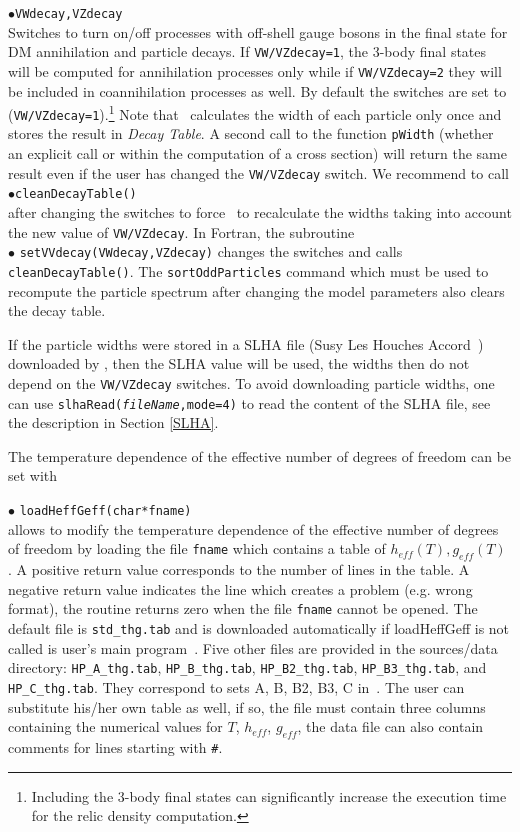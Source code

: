 \documentclass[12pt,a4paper]{article}
\begin{document}
\noindent
$\bullet$\verb|VWdecay,VZdecay|\\
Switches to turn on/off  processes with off-shell gauge bosons in the final state for DM annihilation and particle decays.
If \verb|VW/VZdecay=1|, the  3-body final states will be computed for annihilation processes only while 
if \verb|VW/VZdecay=2| they will be included in coannihilation processes as well.
By  default  the switches are set to (\verb|VW/VZdecay=1|).\footnote{Including the 3-body final states can significantly increase the execution time for the relic density computation.}
Note that \micro\ calculates the width of each particle only once and stores the
result in {\it Decay Table}.  A second call to the function \verb|pWidth| (whether an explicit call or within the computation of a cross section)   will return the same result  even if the user has changed the {\tt VW/VZdecay} switch.  
We recommend to call\\
$\bullet$\verb|cleanDecayTable()| \\
after changing the switches to force \micro\ to recalculate the widths taking into account  the new value of {\tt VW/VZdecay}.
In Fortran, the subroutine\\
$\bullet$ \verb|setVVdecay(VWdecay,VZdecay)| changes the
switches and calls {\tt cleanDecayTable()}.
The   {\tt sortOddParticles} command which must be used 
to recompute the particle spectrum after changing the model parameters also clears  the decay table.

If the particle widths  were stored in a SLHA file (Susy Les Houches Accord~\cite{Skands:2003cj})  downloaded by \micro, then the SLHA value will be used,
the widths  then do not depend on  the {\tt VW/VZdecay} switches. To avoid downloading particle widths, one can use  
{\tt slhaRead({\it fileName},mode=4)} to read the content of the SLHA file, see the description in Section
\ref{SLHA}. 

The temperature dependence of the effective number of degrees of freedom can be set with

\noindent$\bullet$ \verb|loadHeffGeff(char*fname)|\\
allows to modify the temperature dependence of the effective number of degrees of freedom
by loading the file \verb|fname| which contains a table of $h_{eff}(T), g_{eff}(T)$ . 
A positive  return value corresponds to the number of lines in the table. A negative return value indicates the line which creates a problem (e.g. wrong format), the routine returns zero when the file \verb|fname| cannot be opened.  The default file is \verb|std_thg.tab| and is downloaded automatically if 
loadHeffGeff is not called is user's main program~\cite{Gondolo:2004sc}. Five other files are provided in the sources/data directory:  \verb|HP_A_thg.tab|,  \verb|HP_B_thg.tab|, \verb|HP_B2_thg.tab|,  \verb|HP_B3_thg.tab|,    and \verb|HP_C_thg.tab|. They   correspond to sets A, B, B2, B3, C in~\cite{Hindmarsh:2005ix}.
The user can substitute his/her own table as well, if so, the file must contain three columns containing the numerical values for $T$, $h_{eff}$, $g_{eff}$, the data file can also contain comments for lines starting with \verb|#|.
\end{document}
